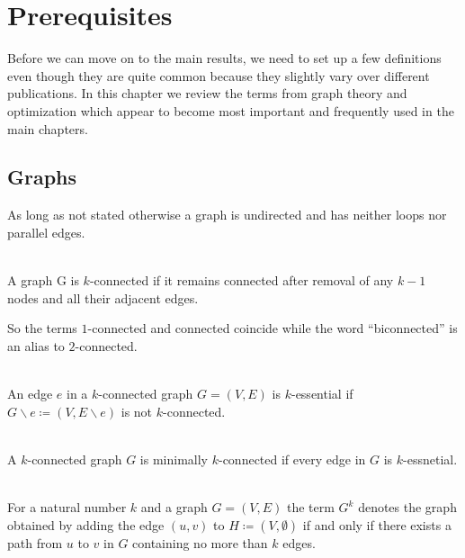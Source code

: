 \chapter{Prerequisites}
Before we can move on to the main results, we need to set up a few definitions even though they are quite common because they slightly vary over different publications. In this chapter we review the terms from graph theory and optimization which appear to become most important and frequently used in the main chapters.

\section{Graphs}
As long as not stated otherwise a graph is undirected and has neither loops nor parallel edges.

\begin{definition} [\(k\)-connected]\label{def:k_connected}\ \\
  A graph G is \(k\)-connected if it remains connected after removal of any \(k-1\) nodes and all their adjacent edges.
\end{definition}

So the terms \(1\)-connected and connected coincide while the word \enquote{biconnected} is an alias to \(2\)-connected.

\begin{definition} [\(k\)-essential]\label{def:k_essential}\ \\
  An edge \(e\) in a \(k\)-connected graph \(G = (V, E)\) is \(k\)-essential if \(G \backslash e \coloneqq (V, E \backslash e)\) is not \(k\)-connected.
\end{definition}

\begin{definition}\label{def:min_k_connected}\ \\
  A \(k\)-connected graph \(G\) is minimally \(k\)-connected if every edge in \(G\) is \(k\)-essnetial.
\end{definition}

\begin{definition}\label{def:power_of_graph}\ \\
  For a natural number \(k\) and a graph \(G = (V, E)\) the term \(G^{k}\) denotes the graph obtained by adding the edge \((u,v)\) to \(H \coloneqq (V, \emptyset)\) if and only if there exists a path from \(u\) to \(v\) in \(G\) containing no more than \(k\) edges.
\end{definition}

